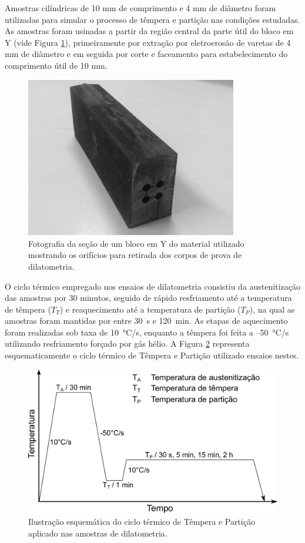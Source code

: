 Amostras cilíndricas de 10 mm de comprimento e 4 mm de diâmetro foram utilizadas para simular o processo de têmpera e partição nas condições estudadas. As amostras foram usinadas a partir da região central da parte útil do bloco em Y (vide Figura \ref{fig:eletroerosaoBlocoY}), primeiramente por extração por eletroerosão de varetas de 4 mm de diâmetro e em seguida por corte e faceamento para estabelecimento do comprimento útil de 10 mm.

\begin{figure}
  \includegraphics[height=7cm]{img/eletroerosaoBlocoY.pdf}
  \caption{Fotografia da seção de um bloco em Y do material utilizado mostrando os orifícios para retirada dos corpos de prova de dilatometria.}
  \label{fig:eletroerosaoBlocoY}
\end{figure}

O ciclo térmico empregado nos ensaios de dilatometria consistiu da austenitização das amostras por 30 minutos, seguido de rápido resfriamento até a temperatura de têmpera ($T_T$) e reaquecimento até a temperatura de partição ($T_P$), na qual as amostras foram mantidas por entre 30~s e 120~min. As etapas de aquecimento foram realizadas sob taxa de \SI{10}{\degreeCelsius/s}, enquanto a têmpera foi feita a --\SI{50}{\degreeCelsius/s} utilizando resfriamento forçado por gás hélio. A Figura \ref{fig:expDil} representa esquematicamente o ciclo térmico de Têmpera e Partição utilizado ensaios nestes.

\begin{figure}
  \includegraphics[width=.8\textwidth]{img/expproc_dil.pdf}
  \caption{Ilustração esquemática do ciclo térmico de Têmpera e Partição aplicado nas amostras de dilatometria.}
  \label{fig:expDil}
\end{figure}


